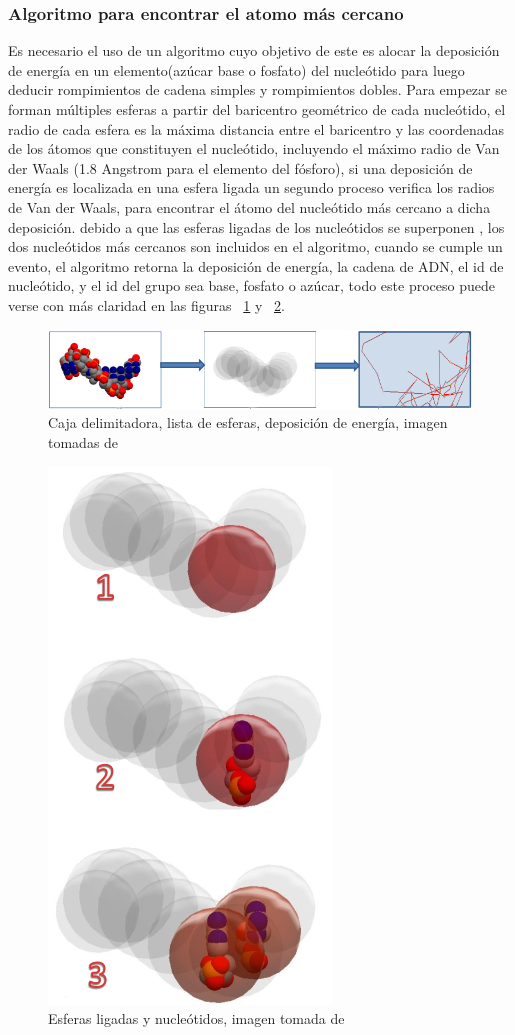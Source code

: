 \subsubsection{Algoritmo para encontrar el atomo más cercano}
Es necesario el uso de un algoritmo cuyo objetivo de este es alocar la deposición de energía en un elemento(azúcar base o fosfato) del nucleótido para luego deducir rompimientos de cadena simples y rompimientos dobles.
Para empezar se forman múltiples esferas a partir del baricentro geométrico de cada nucleótido, el radio de cada esfera es la máxima distancia entre el baricentro y las coordenadas de los átomos que constituyen el nucleótido, incluyendo el máximo radio de Van der Waals (1.8 Angstrom para el elemento del fósforo), si una deposición de energía es localizada en una esfera ligada un segundo proceso verifica los radios de Van der Waals, para encontrar el átomo del nucleótido más cercano a dicha deposición. debido a que las esferas ligadas de los nucleótidos se superponen , los dos nucleótidos más cercanos son incluidos en el algoritmo, cuando se cumple un evento, el algoritmo retorna la deposición de energía, la cadena de ADN, el id de nucleótido, y el id del grupo sea base, fosfato o azúcar, todo este proceso puede verse con más claridad en las figuras ~\ref{fig:deepbox} y ~\ref{fig:algoritmo}.


\begin{figure}[htbp]
    \centering
    \includegraphics[width=.8\linewidth]{./Figures/aalgo.png}
    \caption[Caja delimitadora]{Caja delimitadora, lista de esferas, deposición de energía, imagen tomadas de \cite{handson} }
    \label{fig:deepbox}
\end{figure}

\begin{figure}[htbp]
    \centering
    \includegraphics[width=.3\linewidth]{./Figures/algo.png}
    \caption[Esferas ligadas y nucleótidos]{Esferas ligadas y nucleótidos, imagen tomada de \cite{handson}}
    \label{fig:algoritmo}
\end{figure}

